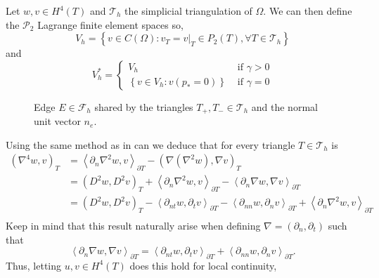 Let $w,v \in  H^{4} \left( T  \right) $ and $\mathcal{T}_{h} $ the simplicial triangulation of $\Omega$. We can then
define the $\mathcal{P}_{2} $ Lagrange finite element spaces so,
\[
V_{h} = \left\{ v \in C\left( \Omega  \right): v_{T} = v | _{T} \in P_{2}\left( T \right), \forall T \in
\mathcal{T}_{h}    \right\}
\]
and
\[
V_{h}^{*} = \begin{cases}
    V_{h} & \text{ if } \gamma > 0 \\
    \left\{ v \in V_{h}: v\left( p_{*} = 0 \right)    \right\} &  \text{ if } \gamma  = 0
\end{cases}
\]
\begin{figure}[!h]
\centering
{}
\caption{Edge $E \in \mathcal{F}_h $ shared by the triangles $T_{+}, T_{-} \in \mathcal{T}_{h} $ and the normal unit vector $n_{e}$.  }
    \label{fig:normal}
\end{figure}


Using the same method as in \cite{gu2012c0, brenner2012quadratic} can we
deduce that for every triangle $T \in  \mathcal{T}_{h} $ is \[
    \begin{split}
        \left( \nabla ^{4} w, v \right) _{T} &= \left< \partial _{n} \nabla ^2 w, v \right>_{\partial T} - \left( \nabla \left( \nabla ^2 w
 \right), \nabla  v  \right)_{T}   \\
 &= \left( D^2w, D^2v \right)_{T} + \left< \partial _{n} \nabla ^2 w, v \right>_{\partial T}  - \left<\partial _{n}
 \nabla w, \nabla v \right>_{\partial T} \\
 &=  \left( D^2 w, D^2 v \right)_{T} - \left<\partial _{nt} w, \partial _{t} v \right>_{\partial T} - \left<\partial
 _{nn} w, \partial _{n} v \right> _{\partial T} +  \left<\partial _{n} \nabla ^2 w, v \right>_{\partial T} \\
    \end{split}
\]
Keep in mind that this result naturally arise when defining $\nabla  = \left( \partial _{n}, \partial _{t} \right) $ such that
\[
\left<\partial _{n} \nabla w, \nabla v \right>_{\partial T} = \left<\partial _{nt} w, \partial _{t} v\right> _{\partial
T} + \left< \partial _{nn} w, \partial _{n} v  \right> _{\partial T} .
\]
 Thus, letting $u,v \in
H^{4}\left( T  \right) $  does this hold for local continuity,


